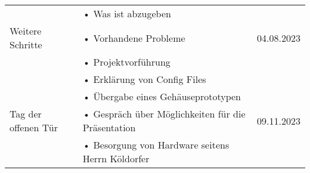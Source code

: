 \begin{table}[H]
\begin{tabular}{p{} | p{} | p{}}
 		\midrule
 			& •	Was ist abzugeben & \\
 		Weitere Schritte & • Vorhandene Probleme & 04.08.2023 \\
 			& •	Projektvorführung & \\
 			& •	Erklärung von Config Files & \\
 		\midrule
 			& •	Übergabe eines Gehäuseprototypen & \\
 		Tag der offenen Tür & • Gespräch über Möglichkeiten für die Präsentation & 09.11.2023 \\
 			& •	Besorgung von Hardware seitens Herrn Köldorfer& \\
		\bottomrule
	\end{tabular}
\end{table}